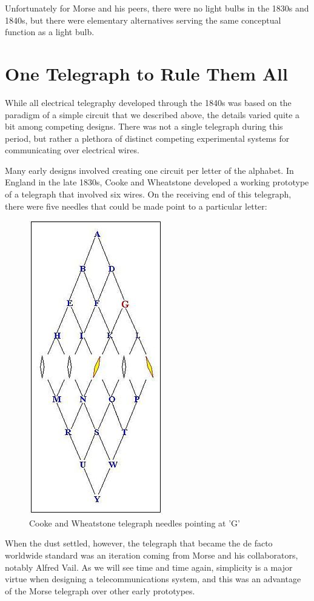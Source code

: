 \documentclass[UTF8]{book}
\begin{document}
\begin{CJK}{UTF8}{gbsn}
Unfortunately for Morse and his peers, there were no light bulbs in the 1830s and 1840s, but there were elementary alternatives serving the same conceptual function as a light bulb.

\section{One Telegraph to Rule Them All}

While all electrical telegraphy developed through the 1840s was based on the paradigm of a simple circuit that we described above, the details varied quite a bit among competing designs. There was not a single telegraph during this period, but rather a plethora of distinct competing experimental systems for communicating over electrical wires.

Many early designs involved creating one circuit per letter of the alphabet. In England in the late 1830s, Cooke and Wheatstone developed a working prototype of a telegraph that involved six wires. On the receiving end of this telegraph, there were five needles that could be made point to a particular letter:

\begin{figure}[H]
\centering
\includegraphics[width=0.4\linewidth]{wheatstone}
\caption{Cooke and Wheatstone telegraph needles pointing at 'G'}
\end{figure}

When the dust settled, however, the telegraph that became the de facto worldwide standard was an iteration coming from Morse and his collaborators, notably Alfred Vail. As we will see time and time again, simplicity is a major virtue when designing a telecommunications system, and this was an advantage of the Morse telegraph over other early prototypes.


\end{CJK}
\end{document}
